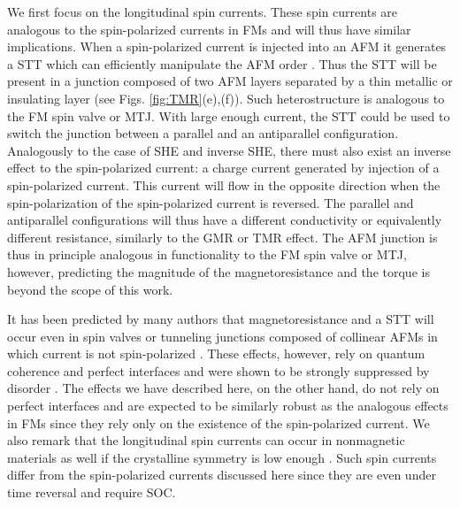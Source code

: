 \documentclass[aps,prl,reprint,amsmath,amssymb,superscriptaddress]{revtex4-1}
\begin{document}
We first focus on the longitudinal spin currents. These spin currents are analogous to the spin-polarized currents in FMs and will thus have similar implications. When a spin-polarized current is injected into an AFM it generates a STT which can efficiently manipulate the AFM order \cite{Gomonay2010,Gomonay2012,Cheng2014c,Fujita2016arxiv}. Thus the STT will be present in a junction composed of two AFM layers separated by a thin metallic or insulating layer (see Figs. \ref{fig:TMR}(e),(f)). Such heterostructure is analogous to the FM spin valve or MTJ. With large enough current, the STT could be used to switch the junction between a parallel and an antiparallel configuration. Analogously to the case of SHE and inverse SHE, there must also exist an inverse effect to the spin-polarized current: a charge current generated by injection of a spin-polarized current. This current will flow in the opposite direction when the spin-polarization of the spin-polarized current is reversed. The parallel and antiparallel configurations will thus have a different conductivity or equivalently different resistance, similarly to the GMR or TMR effect. The AFM junction is thus in principle analogous in functionality to the FM spin valve or MTJ, however, predicting the magnitude of the magnetoresistance and the torque is beyond the scope of this work.

It has been predicted by many authors that magnetoresistance and a STT will occur even in spin valves or tunneling junctions composed of collinear AFMs in which current is not spin-polarized \cite{Nunez2006,Haney2007,Xu2008a,Haney2008a,Prakhya2014,Merodio2014,Saidaoui2014,Macdonald2011,Manchon2016,Saidaoui2016a,Stamenova2017}. These effects, however, rely on quantum coherence and perfect interfaces and were shown to be strongly suppressed by disorder \cite{Duine2007,Saidaoui2014,Manchon2016}. The effects we have described here, on the other hand, do not rely on perfect interfaces and are expected to be similarly robust as the analogous effects in FMs since they rely only on the existence of the spin-polarized current. We also remark that the longitudinal spin currents can occur in nonmagnetic materials as well if the crystalline symmetry is low enough \cite{Wimmer2015}. Such spin currents differ from the spin-polarized currents discussed here since they are even under time reversal and require SOC.
\end{document}
